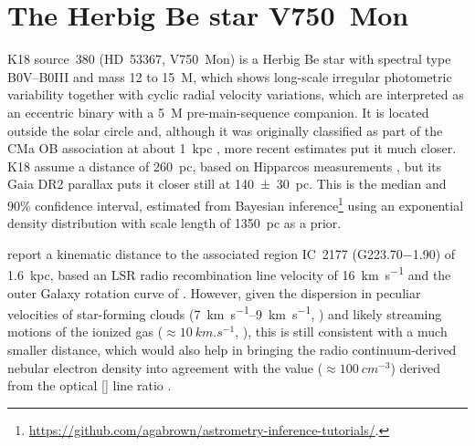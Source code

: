 \documentclass[useAMS, usenatbib, a4paper]{mnras}
\begin{document}


\appendix



\section{The Herbig Be star V750~Mon}
\label{sec:notes-part-sourc}
\label{sec:hd-53367-v750}
  
K18 source~380 (HD~53367, V750~Mon) is a Herbig Be star with spectral
type B0V--B0III and mass 12 to \SI{15}{M_\odot}, which shows
long-scale irregular photometric variability \citep{Tjin-A-Djie:2001a,
  Pogodin:2006a} together with cyclic radial velocity variations,
which are interpreted as an eccentric binary with a \SI{5}{M_\odot}
pre-main-sequence companion.  It is located outside the solar circle
and, although it was originally classified as part of the CMa OB
association at about \SI{1}{kpc} \citep{Tjin-A-Djie:2001a}, more
recent estimates put it much closer.  K18 assume a distance of
\SI{260}{pc}, based on Hipparcos measurements
\citep{van-Leeuwen:2007a}, but its Gaia DR2 parallax
\citep{Gaia-Collaboration:2016a, Gaia-Collaboration:2018a, Luri:2018a}
puts it closer still at \SI{140 \pm 30}{pc}.  This is the median and
90\% confidence interval, estimated from Bayesian
inference\footnote{\url{https://github.com/agabrown/astrometry-inference-tutorials/}.}
using an exponential density distribution with scale length of
\SI{1350}{pc} as a prior.

\citet{Quireza:2006b} report a kinematic distance to the associated
\hii{} region IC~2177 (G\num{223.70}\num{-1.90}) of \SI{1.6}{kpc},
based an LSR radio recombination line velocity of \SI{+16}{km.s^{-1}}
\citep{Quireza:2006a} and the outer Galaxy rotation curve of
\citet{Brand:1993a}.  However, given the dispersion in peculiar
velocities of star-forming clouds (\SIrange{7}{9}{km.s^{-1}},
\citealp{Stark:1984a}) and likely streaming motions of the ionized gas
(\(\approx \SI{10}{km.s^{-1}}\), \citealp{Matzner:2002a, Lee:2012a}),
this is still consistent with a much smaller distance, which would
also help in bringing the radio continuum-derived nebular electron
density into agreement with the value (\(\approx \SI{100}{cm^{-3}}\))
derived from the optical [] line ratio
\citep{Hawley:1978a}.
\end{document}
